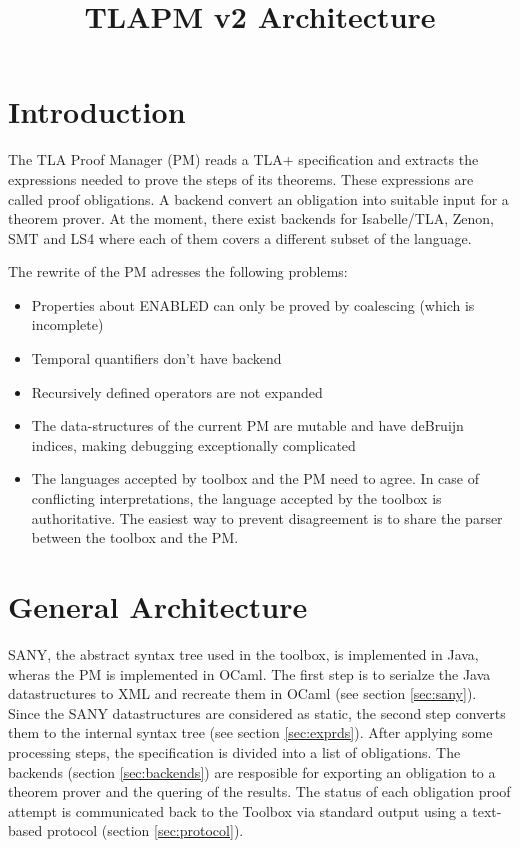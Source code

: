 \documentclass[10pt,a4paper]{article}
\title{TLAPM v2 Architecture}
\begin{document}
\maketitle

\section{Introduction}
\label{sec:introduction}
The TLA Proof Manager (PM) reads a TLA+ specification and extracts the
 expressions needed to prove the steps of its theorems. These expressions are
 called proof obligations. A backend convert an obligation into suitable
 input for a theorem prover. At the moment, there exist backends for
 Isabelle/TLA, Zenon, SMT and LS4 where each of them covers a different subset
 of the language.

The rewrite of the PM adresses the following problems:

\begin{itemize}
\item Properties about ENABLED can only be proved by coalescing (which is
 incomplete)
\item Temporal quantifiers don't have backend
\item Recursively defined operators are not expanded
\item The data-structures of the current PM are mutable and have deBruijn
 indices, making debugging exceptionally complicated
\item The languages accepted by toolbox and the PM need to agree. In case of
 conflicting interpretations, the language accepted by the toolbox is
 authoritative. The easiest way to prevent disagreement is to share the parser
 between the toolbox and the PM.
\end{itemize}


\section{General Architecture}
\label{sec:general}

SANY, the abstract syntax tree used in the toolbox, is implemented in Java,
 wheras the PM is implemented in OCaml. The first step is to serialze the Java
 datastructures to XML and recreate them in OCaml (see section \ref{sec:sany}).
 Since the SANY datastructures are considered as static, the second step
 converts them to the internal syntax tree (see section \ref{sec:exprds}).
 After applying some processing steps, the specification is divided into
 a list of obligations. The backends (section \ref{sec:backends}) are resposible
 for exporting an obligation to a theorem prover and the quering of the results.
 The status of each obligation proof attempt is communicated back to the Toolbox
 via standard output using a text-based protocol (section \ref{sec:protocol}).
\end{document}
